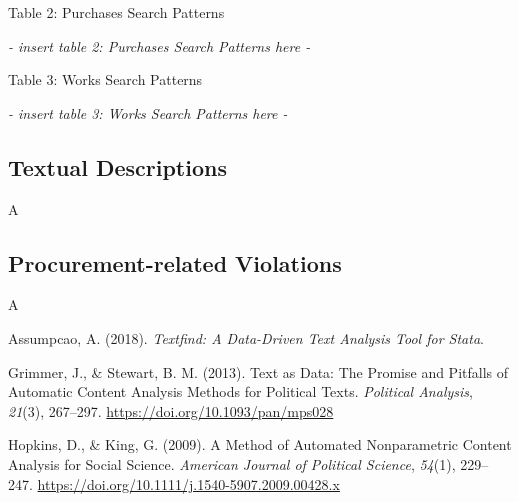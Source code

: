 \documentclass[]{article}
\theoremstyle{definition}
\theoremstyle{definition}
\theoremstyle{definition}
\theoremstyle{remark}
\begin{document}
Table 2: Purchases Search Patterns

\emph{- insert table 2: Purchases Search Patterns here -}

Table 3: Works Search Patterns

\emph{- insert table 3: Works Search Patterns here -}

\hypertarget{quality2}{%
\subsection{Textual Descriptions}\label{quality2}}

A

\hypertarget{quality3}{%
\subsection{Procurement-related Violations}\label{quality3}}

A







\hypertarget{refs}{}
\leavevmode\hypertarget{ref-AssumpcaotextfindDataDrivenText2018}{}%
Assumpcao, A. (2018). \emph{Textfind: A Data-Driven Text Analysis Tool
for Stata}.

\leavevmode\hypertarget{ref-GrimmerTextDataPromise2013a}{}%
Grimmer, J., \& Stewart, B. M. (2013). Text as Data: The Promise and
Pitfalls of Automatic Content Analysis Methods for Political Texts.
\emph{Political Analysis}, \emph{21}(3), 267--297.
\url{https://doi.org/10.1093/pan/mps028}

\leavevmode\hypertarget{ref-HopkinsMethodAutomatedNonparametric2009}{}%
Hopkins, D., \& King, G. (2009). A Method of Automated Nonparametric
Content Analysis for Social Science. \emph{American Journal of Political
Science}, \emph{54}(1), 229--247.
\url{https://doi.org/10.1111/j.1540-5907.2009.00428.x}
\end{document}
